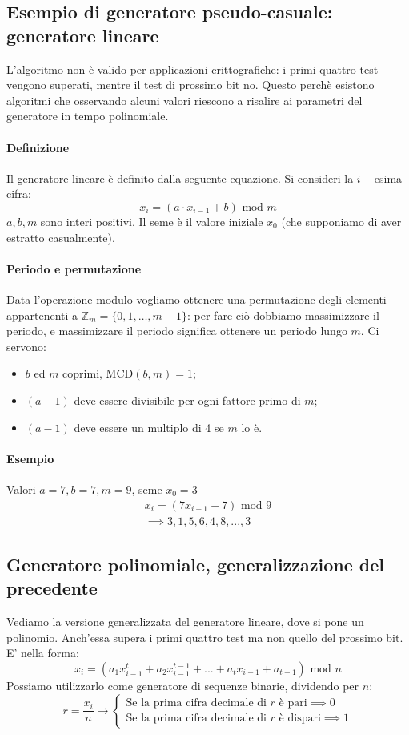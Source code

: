 \subsection{Esempio di generatore pseudo-casuale: generatore lineare}
L'algoritmo non è valido per applicazioni crittografiche: i primi quattro test vengono superati, mentre il test di prossimo bit no. Questo perchè esistono algoritmi che osservando alcuni valori riescono a risalire ai parametri del generatore in tempo polinomiale.

\paragraph{Definizione} Il generatore lineare è definito dalla seguente equazione. Si consideri la $i-$esima cifra:
$$ x_{i} = \left( a \cdot x_{i-1} + b \right) \text{ mod } m $$
$a,b,m$ sono interi positivi. Il seme è il valore iniziale $x_0$ (che supponiamo di aver estratto casualmente). 
\paragraph{Periodo e permutazione} Data l'operazione modulo vogliamo ottenere una permutazione degli elementi appartenenti a $\mathbb{Z}_m = \{0,1,\dots,m-1\}$: per fare ciò dobbiamo massimizzare il periodo, e massimizzare il periodo significa ottenere un periodo lungo $m$. Ci servono:
\begin{itemize}
    \item $b$ ed $m$ coprimi, $\text{MCD}(b, m) = 1$;
    \item $(a-1)$ deve essere divisibile per ogni fattore primo di $m$;
    \item $(a-1)$ deve essere un multiplo di 4 se $m$ lo è.
\end{itemize}

\paragraph{Esempio} Valori $a=7, b=7, m=9$, seme $x_{0}=3$
\begin{align*}
	x_i = (7x_{i-1} + 7) \text{ mod } 9 \\\implies 3, 1, 5, 6, 4, 8, ... , 3
\end{align*}

\subsection{Generatore polinomiale, generalizzazione del precedente}
Vediamo la versione generalizzata del generatore lineare, dove si pone un polinomio. Anch'essa supera i primi quattro test ma non quello del prossimo bit.  E' nella forma:
$$ x_{i} = \left( a_{1}x_{i-1}^{t} + a_{2}x_{i-1}^{t-1} + ... + a_{t}x_{i-1} + a_{t+1} \right) \text{ mod } n $$
Possiamo utilizzarlo come generatore di sequenze binarie, dividendo per $n$:
\[
    r=\frac{x_{i}}{n} \longrightarrow
    \begin{cases}
        \text{Se la prima cifra decimale di $r$ è pari} \implies 0 \\
        \text{Se la prima cifra decimale di $r$ è dispari} \implies 1
    \end{cases}
\]

